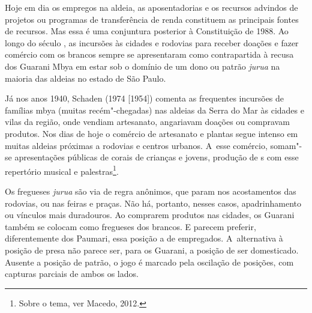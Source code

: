 Hoje em dia os empregos na aldeia, as aposentadorias e os recursos
advindos de projetos ou programas de transferência de renda constituem
as principais fontes de recursos. Mas essa é uma conjuntura posterior à
Constituição de 1988. Ao longo do século , as incursões às cidades e
rodovias para receber doações e fazer comércio com os brancos sempre se
apresentaram como contrapartida à recusa dos Guarani Mbya em estar sob
o domínio de um dono ou patrão \emph{jurua} na maioria das aldeias no estado
de São Paulo. 

Já nos anos 1940, Schaden (1974 [1954]) comenta as frequentes incursões
de famílias mbya (muitas recém"-chegadas) nas aldeias da Serra do Mar às
cidades e vilas da região, onde vendiam artesanato, angariavam doações
ou compravam produtos. Nos dias de hoje o comércio de artesanato e
plantas segue intenso em muitas aldeias próximas a rodovias e centros
urbanos. A~esse comércio, somam"-se apresentações públicas de corais de
crianças e jovens, produção de s com esse repertório musical e
palestras\footnote{Sobre o tema, ver Macedo, 2012.}. 

Os fregueses \emph{jurua} são via de regra anônimos, que param nos acostamentos
das rodovias, ou nas feiras e praças. Não há, portanto, nesses casos,
apadrinhamento ou vínculos mais duradouros. Ao comprarem produtos nas
cidades, os Guarani também se colocam como fregueses dos brancos. E
parecem preferir, diferentemente dos Paumari, essa posição a de
empregados. A~alternativa à posição de presa não parece ser, para os
Guarani, a posição de ser domesticado. Ausente a posição de patrão, o
jogo é marcado pela oscilação de posições, com capturas parciais de
ambos os lados.

